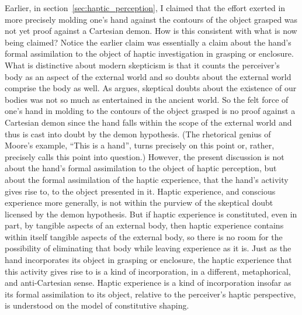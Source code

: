 Earlier, in section~\ref{sec:haptic_perception}, I claimed that the effort exerted in more precisely molding one's hand against the contours of the object grasped was not yet proof against a Cartesian demon. How is this consistent with what is now being claimed? Notice the earlier claim was essentially a claim about the hand's formal assimilation to the object of haptic investigation in grasping or enclosure. What is distinctive about modern skepticism is that it counts the perceiver's body as an aspect of the external world and so doubts about the external world comprise the body as well. As \citet{Burnyeat:1982mz} argues, skeptical doubts about the existence of our bodies was not so much as entertained in the ancient world. So the felt force of one's hand in molding to the contours of the object grasped is no proof against a Cartesian demon since the hand falls within the scope of the external world and thus is cast into doubt by the demon hypothesis. (The rhetorical genius of Moore's \citeyear{Moore:1903uo} example, ``This is a hand'', turns precisely on this point or, rather, precisely calls this point into question.) However, the present discussion is not about the hand's formal assimilation to the object of haptic perception, but about the formal assimilation of the haptic experience, that the hand's activity gives rise to, to the object presented in it. Haptic experience, and conscious experience more generally, is not within the purview of the skeptical doubt licensed by the demon hypothesis. But if haptic experience is constituted, even in part, by tangible aspects of an external body, then haptic experience contains within itself tangible aspects of the external body, so there is no room for the possibility of eliminating that body while leaving experience as it is. Just as the hand incorporates its object in grasping or enclosure, the haptic experience that this activity gives rise to is a kind of incorporation, in a different, metaphorical, and anti-Cartesian sense. Haptic experience is a kind of incorporation insofar as its formal assimilation to its object, relative to the perceiver's haptic perspective, is understood on the model of constitutive shaping.

